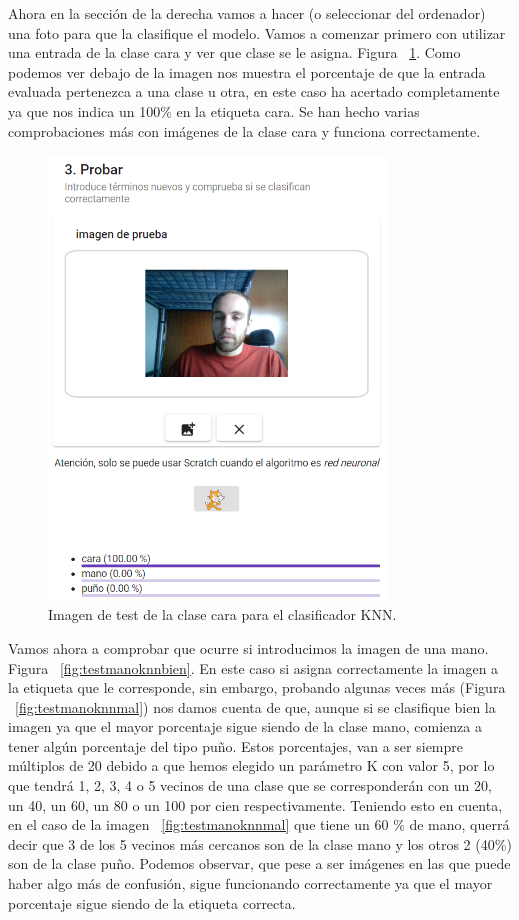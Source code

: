 \documentclass[a4paper, 12pt]{book}
\begin{document}
Ahora en la sección de la derecha vamos a hacer (o seleccionar del ordenador) una foto para que la clasifique el modelo. Vamos a comenzar primero con utilizar una entrada de la clase cara y ver que clase se le asigna. Figura ~\ref{fig:testcaraknn}. Como podemos ver debajo de la imagen nos muestra el porcentaje de que la entrada evaluada pertenezca a una clase u otra, en este caso ha acertado completamente ya que nos indica un 100\% en la etiqueta cara. Se han hecho varias comprobaciones más con imágenes de la clase cara y funciona correctamente.

\begin{figure}
	\centering
	\includegraphics[width=9cm, keepaspectratio]{img/testcaraknn}
	\caption{Imagen de test de la clase cara para el clasificador KNN.}			
	\label{fig:testcaraknn}
\end{figure}

Vamos ahora a comprobar que ocurre si introducimos la imagen de una mano. Figura ~\ref{fig:testmanoknnbien}. En este caso si asigna correctamente la imagen a la etiqueta que le corresponde, sin embargo, probando algunas veces más (Figura ~\ref{fig:testmanoknnmal}) nos damos cuenta de que, aunque si se clasifique bien la imagen ya que el mayor porcentaje sigue siendo de la clase mano, comienza a tener algún porcentaje del tipo puño. Estos porcentajes, van a ser siempre múltiplos de 20 debido a que hemos elegido un parámetro K con valor 5, por lo que tendrá 1, 2, 3, 4 o 5 vecinos de una clase que se corresponderán con un 20, un 40, un 60, un 80 o un 100 por cien respectivamente. Teniendo esto en cuenta, en el caso de la imagen  ~\ref{fig:testmanoknnmal} que tiene un 60 \% de mano, querrá decir que 3 de los 5 vecinos más cercanos son de la clase mano y los otros 2 (40\%) son de la clase puño. Podemos observar, que pese a ser imágenes en las que puede haber algo más de confusión, sigue funcionando correctamente ya que el mayor porcentaje sigue siendo de la etiqueta correcta.
\end{document}
